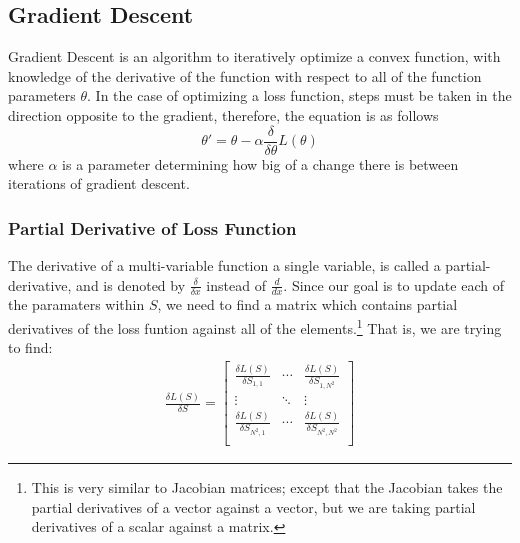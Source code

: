 \subsection{Gradient Descent}%
\label{sub:gradient_descent}
Gradient Descent is an algorithm to iteratively optimize a convex function, with knowledge of the derivative of the function with respect to all of the function parameters $\theta$. In the case of optimizing a loss function, steps must be taken in the direction opposite to the gradient, therefore, the equation is as follows
\begin{equation}
         \theta'=\theta-\alpha \frac{\delta}{\delta \theta}L(\theta)
\end{equation}
where $\alpha$ is a parameter determining how big of a change there is between iterations of gradient descent.

\subsubsection{Partial Derivative of Loss Function}%
\label{ssub:derivative_of_loss_function}
The derivative of a multi-variable function \wrt{} a single variable, is called a partial-derivative, and is denoted by $\frac{\delta}{\delta x}$ instead of $\frac{d}{dx}$. Since our goal is to update each of the paramaters within $S$, we need to find a matrix which contains partial derivatives of the loss funtion against all of the elements.\footnote{This is very similar to Jacobian matrices; except that the Jacobian takes the partial derivatives of a vector against a vector, but we are taking partial derivatives of a scalar against a matrix.} That is, we are trying to find:
 \begin{align*}
         \frac{\delta L(S)}{\delta S}= \begin{bmatrix}
                 \frac{\delta L(S)}{\delta S_{1,1}}&\cdots &\frac{\delta L(S)}{\delta S_{1,N^2}}\\
                 \vdots &\ddots &\vdots \\
                 \frac{\delta L(S)}{\delta S_{N^2,1}}&\cdots &\frac{\delta L(S)}{\delta S_{N^2,N^2}}\\
         \end{bmatrix}
\end{align*}

